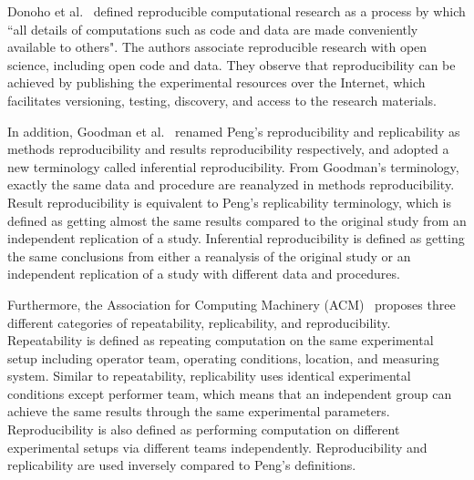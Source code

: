 Donoho et al.~\cite{donoho2009reproducible} defined reproducible 
computational research as a process by which ``all details of 
computations such as code and data are made conveniently available to 
others". The authors associate reproducible research with open science,
including open code and data. They observe that 
reproducibility can be achieved by publishing the experimental 
resources over the Internet, which facilitates versioning, testing, 
discovery, and access to the research materials. 

In addition, Goodman et al.~\cite{goodman2016does} renamed Peng's 
reproducibility and replicability as methods 
reproducibility and results reproducibility respectively, and adopted a 
new terminology called inferential reproducibility.
From Goodman's terminology, exactly the same data and procedure are 
reanalyzed in methods reproducibility. Result reproducibility is 
equivalent to Peng's replicability terminology, which is defined as 
getting almost the same results compared to the original study from an 
independent replication of a study. Inferential reproducibility 
is defined as getting the same conclusions from either a reanalysis of 
the original study or an independent replication of a study with 
different data and procedures.
 
Furthermore, the Association for Computing Machinery 
(ACM)~\cite{acm2016terminology} proposes three different categories of 
repeatability, replicability, and reproducibility. Repeatability is 
defined as repeating computation on the same experimental setup 
including operator team, operating conditions, location, and measuring 
system. 
Similar to repeatability, replicability uses identical experimental 
conditions except performer team,
which means that an independent group can achieve the 
same results through the same experimental parameters. 
Reproducibility is also defined as performing computation on 
different experimental setups via different teams 
independently. Reproducibility and 
replicability are used inversely compared to Peng's definitions. 

